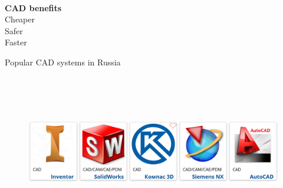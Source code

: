 \documentclass[aspectratio=169]{beamer}
\begin{document}
\begin{frame}[c]{}
    \framesubtitle{}
        \LARGE\centering
        \textbf{CAD benefits}\\
        \medskip
        Cheaper\\
        Safer \\
        Faster
    \end{frame}

\begin{frame}[c]{Popular CAD systems in Russia}
\framesubtitle{}
    \vspace{-0.6cm}
    \begin{figure}[H]
        \centering\includegraphics[height=6.5cm,width=1\textwidth,keepaspectratio]{resources/CADs.png}
        \label{fig:resources/CADs.png}
    \end{figure}
\end{frame}
\end{document}
